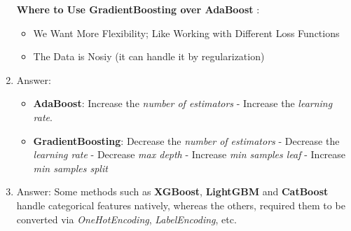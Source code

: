 \documentclass[a4paper,12pt]{article}
\begin{document}
\begin{enumerate}[label=(\alph*)]
    \noindent\textbf{Where to Use GradientBoosting over AdaBoost }:
    \begin{itemize}
        \item We Want More Flexibility; Like Working with Different Loss Functions
        \item The Data is Nosiy (it can handle it by regularization)
    \end{itemize} 

    \item Answer:
    \begin{itemize}
        \item \textbf{AdaBoost}: Increase the \textit{number of estimators} - Increase the \textit{learning rate}.
        \item \textbf{GradientBoosting}: Decrease the \textit{number of estimators} - Decrease the \textit{learning rate} - Decrease \textit{max depth} - Increase \textit{min samples leaf} - Increase \textit{min samples split}
    \end{itemize}

    \item Answer: Some methods such as \textbf{XGBoost}, \textbf{LightGBM} and \textbf{CatBoost} handle categorical features natively, whereas the others, required them to be converted via \textit{OneHotEncoding}, \textit{LabelEncoding}, etc.
\end{enumerate}
\end{document}
